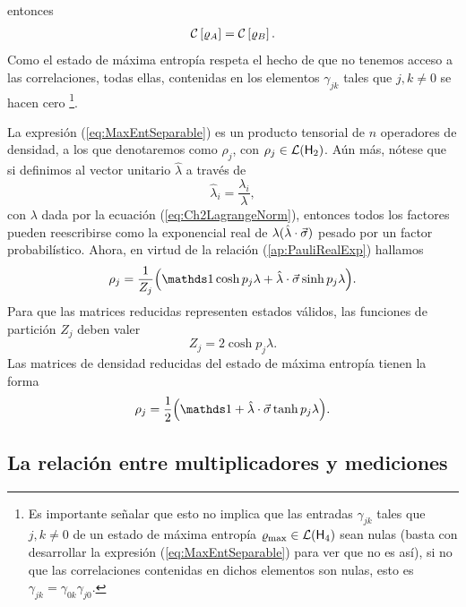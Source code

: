 entonces
\begin{align}
    \mathcal{C}\left[\varrho_{A}\right]=\mathcal{C}\left[\varrho_{B}\right].\nonumber
\end{align}
Como el estado de máxima entropía respeta el hecho de que no tenemos acceso a las correlaciones, todas ellas, contenidas en los elementos $\gamma_{jk}$ tales que $j,k\neq 0$ se hacen cero \footnote{Es importante señalar que esto no implica que las entradas $\gamma_{jk}$ tales que $j,k\neq 0$ de un estado de máxima entropía $\varrho_{\max}\in\mathcal{L}({\sf H}_{4})$ sean nulas (basta con desarrollar la expresión (\ref{eq:MaxEntSeparable}) para ver que no es así), si no que las correlaciones contenidas en dichos elementos son nulas, esto es $\gamma_{jk}=\gamma_{0k}\gamma_{j0}$.}. 



La expresión (\ref{eq:MaxEntSeparable}) es un producto tensorial de $n$ operadores de densidad, a los que denotaremos como $\rho_{j}$, con $\rho_{j}\in\mathcal{L}({\sf H}_{2})$. Aún más, nótese que si definimos al vector unitario $\hat{\lambda}$ a través de
\begin{equation}
    \hat{\lambda}_{i}=\frac{\lambda_{i}}{\lambda},\nonumber
\end{equation}
con $\lambda$ dada por la ecuación (\ref{eq:Ch2LagrangeNorm}), entonces todos los factores pueden reescribirse como la exponencial real de $\lambda(\hat{\lambda}\cdot\vec{\sigma})$ pesado por un factor probabilístico. Ahora, en virtud de la relación (\ref{ap:PauliRealExp}) hallamos
\begin{equation}
    \rho_{j}=\frac{1}{Z_{j}}\qty(\Id\cosh{p_{j}\lambda}+\paulivec{\lambda}\sinh{p_{j}\lambda}).\nonumber
\end{equation}
Para que las matrices reducidas representen estados válidos, las funciones de partición $Z_{j}$ deben valer
\begin{equation}
    Z_{j}=2\cosh{p_{j}\lambda}.\nonumber
\end{equation}
Las matrices de densidad reducidas del estado de máxima entropía tienen la forma
\begin{equation}\label{eq:rhoArhoB}
    \rho_{j}=\frac{1}{2}\qty(\Id+\paulivec{\lambda}\tanh{p_{j}\lambda}).
\end{equation}

\subsection{La relación entre multiplicadores y mediciones}

